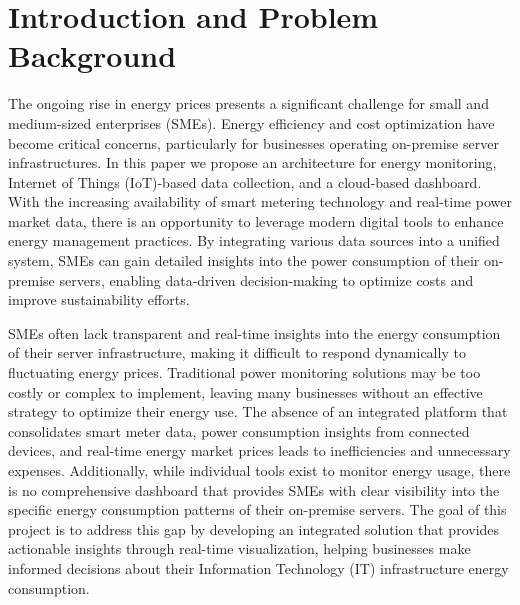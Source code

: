 
\section{Introduction and Problem Background}

The ongoing rise in energy prices presents a significant challenge for small and medium-sized enterprises (SMEs).
Energy efficiency and cost optimization have become critical concerns, particularly for businesses operating on-premise server infrastructures.
In this paper we propose an architecture for energy monitoring, Internet of Things (IoT)-based data collection, and a cloud-based dashboard.
With the increasing availability of smart metering technology and real-time power market data, there is an opportunity to leverage modern digital tools
to enhance energy management practices.
By integrating various data sources into a unified system, SMEs can gain detailed insights into the power consumption of their on-premise servers, 
enabling data-driven decision-making to optimize costs and improve sustainability efforts.

SMEs often lack transparent and real-time insights into the energy consumption of their server infrastructure, making it difficult to respond dynamically to fluctuating energy prices. 
Traditional power monitoring solutions may be too costly or complex to implement, leaving many businesses without an effective strategy to optimize their energy use. 
The absence of an integrated platform that consolidates smart meter data, power consumption insights from connected devices, and real-time energy market prices leads
to inefficiencies and unnecessary expenses.
Additionally, while individual tools exist to monitor energy usage, there is no comprehensive dashboard that provides SMEs with clear visibility 
into the specific energy consumption patterns of their on-premise servers. 
The goal of this project is to address this gap by developing an integrated solution that provides actionable insights through real-time visualization, 
helping businesses make informed decisions about their Information Technology (IT) infrastructure energy consumption.

